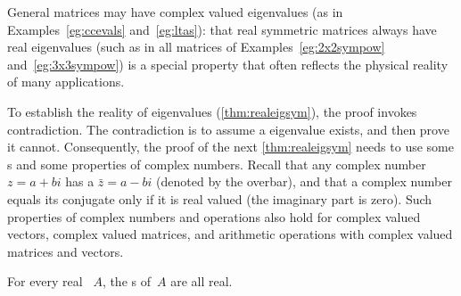 
General matrices may have complex valued eigenvalues (as in Examples~\ref{eg:ccevals} and~\ref{eg:ltas}): that real symmetric matrices always have real eigenvalues (such as in all matrices of Examples~\ref{eg:2x2sympow} and~\ref{eg:3x3sympow}) is a special property that often reflects the physical reality of many applications.

To establish the reality of eigenvalues (\autoref{thm:realeigsym}), the proof invokes contradiction. 
The contradiction is to assume a  eigenvalue exists, and then prove it cannot.
Consequently, the proof of the next \autoref{thm:realeigsym} needs to use some s and some properties of complex numbers.
Recall that any complex number \(z=a+bi\) has a  \(\bar z=a-bi\) (denoted by the overbar), and that a complex number equals its conjugate only if it is real valued (the imaginary part is zero).
Such properties of complex numbers and operations also hold for complex valued vectors, complex valued matrices, and arithmetic operations with complex valued matrices and vectors.


\begin{comment}
Have not yet thought of reasonable Activities for this subsection.
\end{comment}




\begin{theorem} \label{thm:realeigsym} 
For every real ~\(A\), the s of~\(A\) are all real.
\end{theorem}



